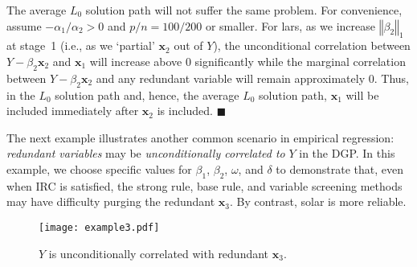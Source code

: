 \documentclass[11pt,authoryear]{elsarticle}
\begin{document}
The average $L_0$ solution path will not suffer the same problem. For convenience, assume $-\alpha_1 / \alpha_2 > 0$ and $p/n = 100/200$ or smaller. For lars, as we increase $\left\Vert \beta_2 \right\Vert_1$ at stage~1 (i.e., as we `partial' $\mathbf{x}_2$ out of $Y$), the unconditional correlation between $Y - \beta_2 \mathbf{x}_2$ and $\mathbf{x}_1$ will increase above $0$ significantly while the marginal correlation between $Y - \beta_2 \mathbf{x}_2$ and any redundant variable will remain approximately $0$. Thus, in the $L_0$ solution path and, hence, the average $L_0$ solution path, $\mathbf{x}_1$ will be included immediately after $\mathbf{x}_2$ is included. $\blacksquare$

\smallskip
The next example illustrates another common scenario in empirical regression: \emph{redundant variables} may be \emph{unconditionally correlated to} $Y$ in the DGP. In this example, we choose specific values for $\beta_1$, $\beta_2$, $\omega$, and $\delta$ to demonstrate that, even when IRC is satisfied, the strong rule, base rule, and variable screening methods may have difficulty purging the redundant $\mathbf{x}_3$. By contrast, solar is more reliable.

\begin{figure}[h]
    \centering
    \texttt{[image: example3.pdf]}
    \caption{$Y$ is unconditionally correlated with redundant $\mathbf{x}_3$.}
    \label{fig:cond_example}
  \end{figure}
\end{document}
